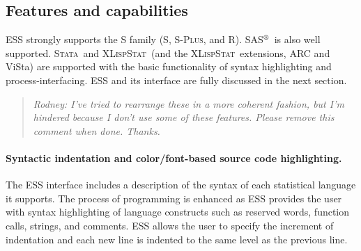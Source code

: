 \documentclass{article}
\newcommand*{\SAS}{\textsc{SAS}$^{\mbox{\scriptsize\textregistered}}$}
\newcommand*{\Splus}{\textsc{S-Plus}}
\newcommand*{\XLispStat}{\textsc{XLispStat}}
\newcommand*{\Stata}{\textsc{Stata}}
\newcommand{\stexttt}[1]{{\small\texttt{#1}}}
\newenvironment{Comment}{\begin{quote}\small\itshape }{\end{quote}}
\begin{document}



\subsection{Features and capabilities}
\label{sec:ESS:features}


ESS strongly supports the S family (S, \Splus, and R).
\SAS\ is also well supported.  \Stata\
and \XLispStat\ (and the \XLispStat\ extensions, ARC and ViSta) are
supported with the basic functionality of syntax highlighting and
process-interfacing.  ESS and its interface are fully discussed in the
next section.

\begin{Comment}
 Rodney:  I've tried to rearrange these in a more coherent fashion,
but I'm hindered because I don't use some of these
features.  Please remove this comment when done.  Thanks.
\end{Comment}

\paragraph{Syntactic indentation and color/font-based source code
  highlighting.}  The ESS interface includes a description of the
syntax of each statistical language it supports.
The process of programming is enhanced as ESS provides the user with
syntax highlighting of language constructs such as reserved words,
function calls, strings, and comments.  ESS allows the user to specify
the increment of indentation and each new line is indented
to the same level as the previous line.
\end{document}
